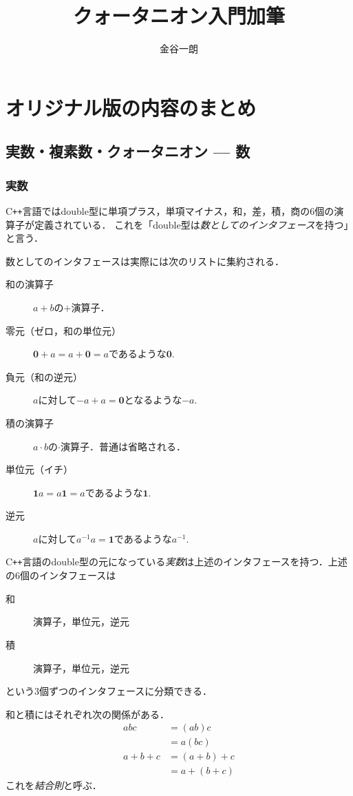 \documentclass{jsbook}
\title{クォータニオン入門加筆}
\author{金谷一朗}
\newcommand{\cxx}{\textrm{C}\texttt{++}}
\newcommand{\keyword}[1]{\emph{#1}}
\newcommand{\zero}{\mathbf{0}}
\newcommand{\one}{\mathbf{1}}
\begin{document}
\setlength{\baselineskip}{17pt}
\setcounter{chapter}{-1}

\maketitle
\tableofcontents

\chapter{オリジナル版の内容のまとめ}

\section{実数・複素数・クォータニオン --- 数}

\subsection{実数}

\cxx 言語ではdouble型に単項プラス，単項マイナス，和，差，積，商の6個の演算子が定義されている．
これを「double型は\keyword{数としてのインタフェース}を持つ」と言う．

数としてのインタフェースは実際には次のリストに集約される．
\begin{description}
\item[和の演算子] $a+b$の$+$演算子．
\item[零元（ゼロ，和の単位元）] $\zero+a=a+\zero=a$であるような$\zero.$
\item[負元（和の逆元）] $a$に対して$-a+a=\zero$となるような$-a.$
\item[積の演算子] $a\cdot b$の$\cdot$演算子．普通は省略される．
\item[単位元（イチ）] $\one a=a\one=a$であるような$\one.$
\item[逆元] $a$に対して$a^{-1}a=\one$であるような$a^{-1}.$
\end{description}
\cxx 言語のdouble型の元になっている\keyword{実数}は上述のインタフェースを持つ．上述の6個のインタフェースは
\begin{description}
\item[和] 演算子，単位元，逆元
\item[積] 演算子，単位元，逆元
\end{description}
という3個ずつのインタフェースに分類できる．

和と積にはそれぞれ次の関係がある．
\begin{align}
abc&=(ab)c\\
  &=a(bc)\\
a+b+c&=(a+b)+c\\
  &=a+(b+c)
\end{align}
これを\keyword{結合則}と呼ぶ．
\end{document}
